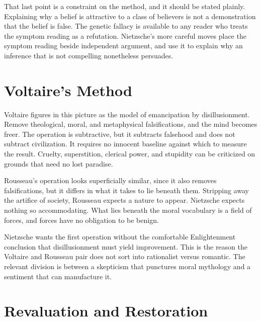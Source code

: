 \documentclass[11pt]{article}
\theoremstyle{definition}
\begin{document}
That last point is a constraint on the method, and it should be stated plainly. Explaining why a belief is attractive to a class of believers is not a demonstration that the belief is false. The genetic fallacy is available to any reader who treats the symptom reading as a refutation. Nietzsche's more careful moves place the symptom reading beside independent argument, and use it to explain why an inference that is not compelling nonetheless persuades.

\section{Voltaire's Method}

Voltaire figures in this picture as the model of emancipation by disillusionment. Remove theological, moral, and metaphysical falsifications, and the mind becomes freer. The operation is subtractive, but it subtracts falsehood and does not subtract civilization. It requires no innocent baseline against which to measure the result. Cruelty, superstition, clerical power, and stupidity can be criticized on grounds that need no lost paradise.

Rousseau's operation looks superficially similar, since it also removes falsifications, but it differs in what it takes to lie beneath them. Stripping away the artifice of society, Rousseau expects a nature to appear. Nietzsche expects nothing so accommodating. What lies beneath the moral vocabulary is a field of forces, and forces have no obligation to be benign.

Nietzsche wants the first operation without the comfortable Enlightenment conclusion that disillusionment must yield improvement. This is the reason the Voltaire and Rousseau pair does not sort into rationalist versus romantic. The relevant division is between a skepticism that punctures moral mythology and a sentiment that can manufacture it.

\section{Revaluation and Restoration}
\end{document}
